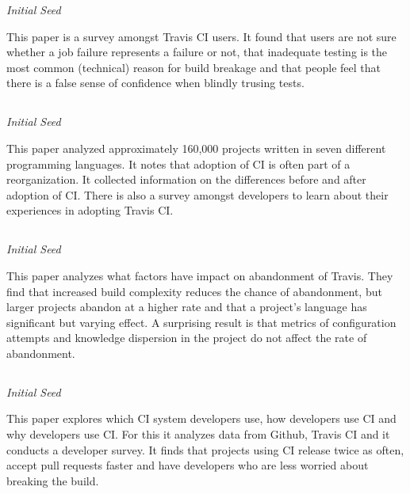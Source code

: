 \documentclass[]{book}
\begin{document}
\emph{Initial Seed}

This paper is a survey amongst Travis CI users. It found that users are
not sure whether a job failure represents a failure or not, that
inadequate testing is the most common (technical) reason for build
breakage and that people feel that there is a false sense of confidence
when blindly trusing tests.

\subsection{\texorpdfstring{\citet{zhao2017impact}}{@zhao2017impact}}\label{zhao2017impact}

\emph{Initial Seed}

This paper analyzed approximately 160,000 projects written in seven
different programming languages. It notes that adoption of CI is often
part of a reorganization. It collected information on the differences
before and after adoption of CI. There is also a survey amongst
developers to learn about their experiences in adopting Travis CI.

\subsection{\texorpdfstring{\citet{widder2018m}}{@widder2018m}}\label{widder2018m}

\emph{Initial Seed}

This paper analyzes what factors have impact on abandonment of Travis.
They find that increased build complexity reduces the chance of
abandonment, but larger projects abandon at a higher rate and that a
project's language has significant but varying effect. A surprising
result is that metrics of configuration attempts and knowledge
dispersion in the project do not affect the rate of abandonment.

\subsection{\texorpdfstring{\citet{hilton2016usage}}{@hilton2016usage}}\label{hilton2016usage}

\emph{Initial Seed}

This paper explores which CI system developers use, how developers use
CI and why developers use CI. For this it analyzes data from Github,
Travis CI and it conducts a developer survey. It finds that projects
using CI release twice as often, accept pull requests faster and have
developers who are less worried about breaking the build.
\end{document}
